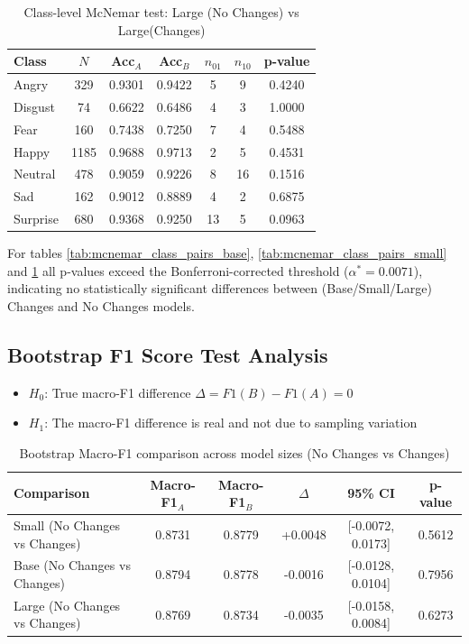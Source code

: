 \begin{table}[H]
\centering
\caption{Class-level McNemar test: Large (No Changes) vs Large(Changes)}
\label{tab:mcnemar_class_pairs_large}
\begin{tabular}{lcccccc}
\hline
Class & $N$ & Acc$_A$ & Acc$_B$ & $n_{01}$ & $n_{10}$ & p-value \\
\hline
Angry    & 329  & 0.9301 & 0.9422 & 5  & 9  & 0.4240 \\
Disgust  & 74   & 0.6622 & 0.6486 & 4  & 3  & 1.0000 \\
Fear     & 160  & 0.7438 & 0.7250 & 7  & 4  & 0.5488 \\
Happy    & 1185 & 0.9688 & 0.9713 & 2  & 5  & 0.4531 \\
Neutral  & 478  & 0.9059 & 0.9226 & 8  & 16 & 0.1516 \\
Sad      & 162  & 0.9012 & 0.8889 & 4  & 2  & 0.6875 \\
Surprise & 680  & 0.9368 & 0.9250 & 13 & 5  & 0.0963 \\
\bottomrule
\end{tabular}
\end{table}


For tables \ref{tab:mcnemar_class_pairs_base}, \ref{tab:mcnemar_class_pairs_small} and \ref{tab:mcnemar_class_pairs_large} all p-values exceed the Bonferroni-corrected threshold ($\alpha^* = 0.0071$), indicating no statistically significant differences between (Base/Small/Large) Changes and No Changes models.

\subsection{Bootstrap F1 Score Test Analysis}


\begin{itemize}
\item  $H_0$: True macro-F1 difference $\Delta = F1(B) - F1(A) = 0$
\item $H_1$: The  macro-F1 difference is real and not due to sampling variation
\end{itemize}
 

\begin{table}[H]
\centering
\caption{Bootstrap Macro-F1 comparison across model sizes (No Changes vs Changes)}
\label{tab:bootstrap_f1_macro}
\begin{tabular}{lccccc}
\hline
Comparison & Macro-F1$_A$ & Macro-F1$_B$ & $\Delta$ & 95\% CI & p-value \\
\hline
Small (No Changes vs Changes) 
& 0.8731 & 0.8779 & +0.0048 & [-0.0072, 0.0173] & 0.5612 \\

Base (No Changes vs Changes)  
& 0.8794 & 0.8778 & -0.0016 & [-0.0128, 0.0104] & 0.7956 \\

Large (No Changes vs Changes) 
& 0.8769 & 0.8734 & -0.0035 & [-0.0158, 0.0084] & 0.6273 \\
\end{tabular}
\end{table}


